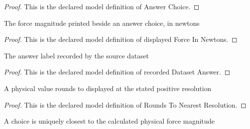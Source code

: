 \begin{proof}
  This is the declared model definition of Answer Choice.
\end{proof}
\begin{definition}
  \label{def:physics:phyx-mini-0893:phyxminiproblems-problemphyxmini0893-answerchoice-displayedforceinnewtons}
  The force magnitude printed beside an answer choice, in newtons
\end{definition}
\begin{proof}
  This is the declared model definition of displayed Force In Newtons.
\end{proof}
\begin{definition}
  \label{def:physics:phyx-mini-0893:phyxminiproblems-problemphyxmini0893-recordeddatasetanswer}
  The answer label recorded by the source dataset
\end{definition}
\begin{proof}
  This is the declared model definition of recorded Dataset Answer.
\end{proof}
\begin{definition}
  \label{def:physics:phyx-mini-0893:phyxminiproblems-problemphyxmini0893-roundstonearestresolution}
  A physical value rounds to displayed at the stated positive resolution
\end{definition}
\begin{proof}
  This is the declared model definition of Rounds To Nearest Resolution.
\end{proof}
\begin{definition}
  \label{def:physics:phyx-mini-0893:phyxminiproblems-problemphyxmini0893-isuniqueclosestdisplayedanswer}
  A choice is uniquely closest to the calculated physical force magnitude
\end{definition}
